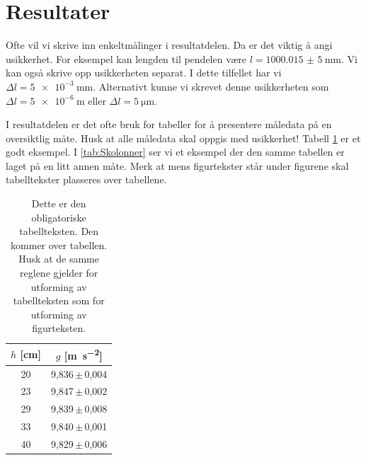 \section{Resultater}
Ofte vil vi skrive inn enkeltmålinger i resultatdelen. Da er det viktig å angi usikkerhet. For eksempel kan lengden til pendelen være $l=\SI{1000,015(5)}{\milli\metre}$. 
Vi kan også skrive opp usikkerheten separat. I dette tilfellet har vi $\Delta l=\SI{5e-3}{\milli\metre}$. Alternativt kunne vi skrevet denne usikkerheten som $\Delta l=\SI{5e-6}{\metre}$ eller $\Delta l=\SI{5}{\micro\metre}$.

I resultatdelen er det ofte bruk for tabeller for å presentere måledata på en oversiktlig måte. Husk at alle måledata skal oppgis med usikkerhet! Tabell \ref{tab:ckolonner} er et godt eksempel. 
I \autoref{tab:Skolonner} ser vi et eksempel der den samme tabellen er laget på en litt annen måte. Merk at mens figurtekster står under figurene skal tabelltekster plasseres over tabellene.

\begin{table}[tbp]
\centering %
\caption{Dette er den obligatoriske tabellteksten. Den kommer over tabellen. Husk at de samme reglene gjelder for utforming av tabellteksten som for utforming av figurteksten.}
\label{tab:ckolonner}	%
\begin{tabular}{cc} %
\toprule %
$h$ [\si{\centi\metre}] & $g$ [\si{\metre\per\second\squared}] \\ %
\midrule
20  & 9,836\,$\pm$\,0,004 \\ %
23  & 9,847\,$\pm$\,0,002 \\
29  & 9,839\,$\pm$\,0,008 \\
33  & 9,840\,$\pm$\,0,001 \\
40  & 9,829\,$\pm$\,0,006 \\
\bottomrule
\end{tabular}
\end{table}

